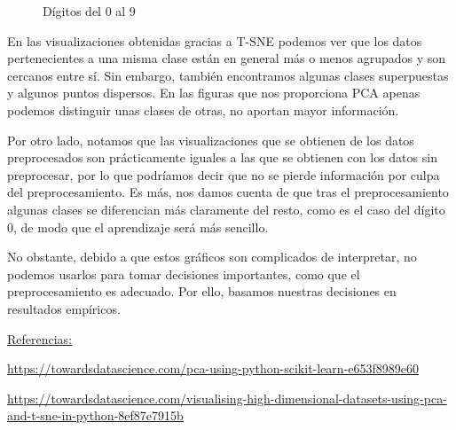 \documentclass[a4]{article}
\begin{document}
\begin{figure}[H]
	\caption{Dígitos del 0 al 9}
	\label{fig:dimreduction3}
\end{figure}

En las visualizaciones obtenidas gracias a T-SNE podemos ver que los datos pertenecientes a una misma clase están en general más o menos agrupados y son cercanos entre sí. Sin embargo, también encontramos algunas clases superpuestas y algunos puntos dispersos. En las figuras que nos proporciona PCA apenas podemos distinguir unas clases de otras, no aportan mayor información. 

Por otro lado, notamos que las visualizaciones que se obtienen de los datos preprocesados son prácticamente iguales a las que se obtienen con los datos sin preprocesar, por lo que podríamos decir que no se pierde información por culpa del preprocesamiento. Es más, nos damos cuenta de que tras el preprocesamiento algunas clases se diferencian más claramente del resto, como es el caso del dígito 0, de modo que el aprendizaje será más sencillo. 

No obstante, debido a que estos gráficos son complicados de interpretar, no podemos usarlos para tomar decisiones importantes, como que el preprocesamiento es adecuado. Por ello, basamos nuestras decisiones en resultados empíricos. 


\underline{Referencias:}

 \href{https://towardsdatascience.com/pca-using-python-scikit-learn-e653f8989e60}{https://towardsdatascience.com/pca-using-python-scikit-learn-e653f8989e60}

 \href{https://towardsdatascience.com/visualising-high-dimensional-datasets-using-pca-and-t-sne-in-python-8ef87e7915b}{https://towardsdatascience.com/visualising-high-dimensional-datasets-using-pca-and-t-sne-in-python-8ef87e7915b}
 
\end{document}
